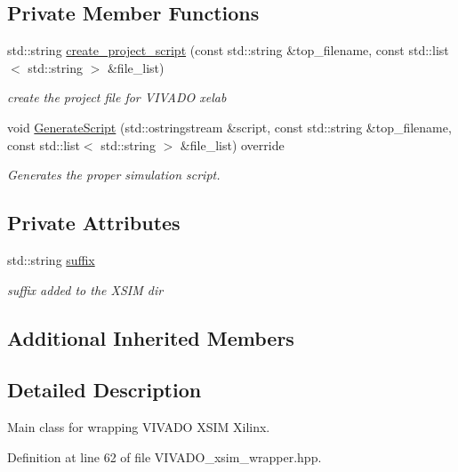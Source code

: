 \subsection*{Private Member Functions}
\begin{DoxyCompactItemize}
\item 
std\+::string \hyperlink{classVIVADO__xsim__wrapper_af41bba7dc3aace458c6626fbd0e1bc04}{create\+\_\+project\+\_\+script} (const std\+::string \&top\+\_\+filename, const std\+::list$<$ std\+::string $>$ \&file\+\_\+list)
\begin{DoxyCompactList}\small\item\em create the project file for V\+I\+V\+A\+DO xelab \end{DoxyCompactList}\item 
void \hyperlink{classVIVADO__xsim__wrapper_adc04b335afab76135cd6b33997db4203}{Generate\+Script} (std\+::ostringstream \&script, const std\+::string \&top\+\_\+filename, const std\+::list$<$ std\+::string $>$ \&file\+\_\+list) override
\begin{DoxyCompactList}\small\item\em Generates the proper simulation script. \end{DoxyCompactList}\end{DoxyCompactItemize}
\subsection*{Private Attributes}
\begin{DoxyCompactItemize}
\item 
std\+::string \hyperlink{classVIVADO__xsim__wrapper_a2a60246f92c8468a49b075003d453508}{suffix}
\begin{DoxyCompactList}\small\item\em suffix added to the X\+S\+IM dir \end{DoxyCompactList}\end{DoxyCompactItemize}
\subsection*{Additional Inherited Members}


\subsection{Detailed Description}
Main class for wrapping V\+I\+V\+A\+DO X\+S\+IM Xilinx. 

Definition at line 62 of file V\+I\+V\+A\+D\+O\+\_\+xsim\+\_\+wrapper.\+hpp.



